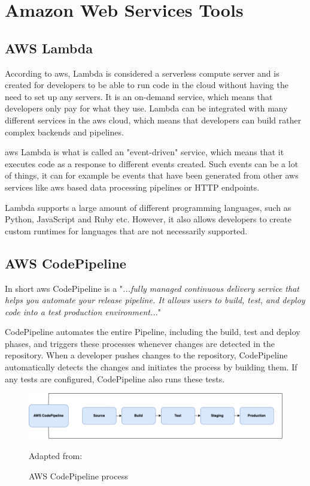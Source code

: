\section{Amazon Web Services Tools}
\subsection{AWS Lambda}
According to \acrshort{aws},  Lambda is considered a serverless compute server and is created for developers to be able to run code in the cloud without having the need to set up any servers.\cite{AWSLamda} It is an on-demand service, which means that developers only pay for what they use. Lambda can be integrated with many different services in the \acrshort{aws} cloud, which means that developers can build rather complex backends and pipelines. 

\acrshort{aws} Lambda is what is called an "event-driven" service, which means that it executes code as a response to different events created. Such events can be a lot of things, it can for example be events that have been generated from other \acrshort{aws} services like \acrshort{aws} based data processing pipelines or HTTP endpoints. 

Lambda supports a large amount of different programming languages, such as Python, JavaScript and Ruby etc. However, it also allows developers to create custom runtimes for languages that are not necessarily supported. 



\subsection{AWS CodePipeline}
In short \acrshort{aws} CodePipeline is a "\textit{...fully managed continuous delivery service that helps you automate your release pipeline. It allows users to build, test, and deploy code into a test production environment...}"
\cite{AWSCodePipeline}

CodePipeline automates the entire \gls{Pipeline}, including the build, test and deploy phases, and triggers these processes whenever changes are detected in the repository. When a developer pushes changes to the repository, CodePipeline automatically detects the changes and initiates the process by building them. If any tests are configured, CodePipeline also runs these tests.\cite{AWSCodePipeline1}
\begin{figure}[htp]
    \centering
    \includegraphics[width=1\columnwidth]{Images/CodePipeline.png}
    \caption{AWS CodePipeline process}Adapted from: \cite{AWSCodePipeline2}
    \label{fig:my_label}
\end{figure}

